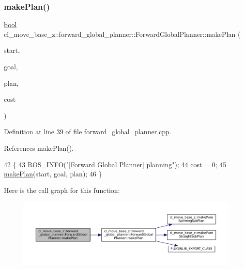 \subsubsection{\texorpdfstring{make\+Plan()}{makePlan()}\hspace{0.1cm}{\footnotesize\ttfamily [2/2]}}
{\footnotesize\ttfamily \hyperlink{classbool}{bool} cl\+\_\+move\+\_\+base\+\_\+z\+::forward\+\_\+global\+\_\+planner\+::\+Forward\+Global\+Planner\+::make\+Plan (\begin{DoxyParamCaption}\item[{const geometry\+\_\+msgs\+::\+Pose\+Stamped \&}]{start,  }\item[{const geometry\+\_\+msgs\+::\+Pose\+Stamped \&}]{goal,  }\item[{std\+::vector$<$ geometry\+\_\+msgs\+::\+Pose\+Stamped $>$ \&}]{plan,  }\item[{double \&}]{cost }\end{DoxyParamCaption})}



Definition at line 39 of file forward\+\_\+global\+\_\+planner.\+cpp.



References make\+Plan().


\begin{DoxyCode}
42 \{
43     ROS\_INFO(\textcolor{stringliteral}{"[Forward Global Planner] planning"});
44     cost = 0;
45     \hyperlink{classcl__move__base__z_1_1forward__global__planner_1_1ForwardGlobalPlanner_a9d7c48877a390ca3cc580a7ffa50d316}{makePlan}(start, goal, plan);
46 \}
\end{DoxyCode}
Here is the call graph for this function\+:
\nopagebreak
\begin{figure}[H]
\begin{center}
\leavevmode
\includegraphics[width=350pt]{classcl__move__base__z_1_1forward__global__planner_1_1ForwardGlobalPlanner_ab01769603169105e92d9b6e479147bce_cgraph}
\end{center}
\end{figure}


